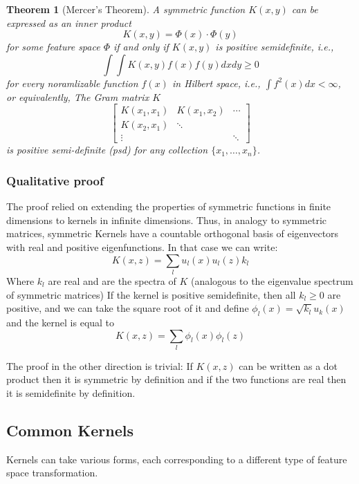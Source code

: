 \documentclass[11pt]{book} %
\newtheorem{theorem}{Theorem}[section]
\begin{document}
\begin{theorem}[Mercer's Theorem]
    A symmetric function \( K(x, y) \) can be expressed as an inner product 
    \[
        K(x, y) = \Phi(x) \cdot \Phi(y)  
    \]
    for some feature space \( \Phi \) if and only if \( K(x, y) \) is positive semidefinite, i.e.,
    \[
        \int \int K(x, y) f(x) f(y) dx dy \geq 0 
    \]
    for every noramlizable function $f(x)$ in Hilbert space, i.e., $\int f^2(x) dx < \infty$, \\
    or equivalently, The Gram matrix $K$ 
    \[
    \begin{bmatrix}
        K(x_1, x_1) & K(x_1, x_2) & \cdots \\
        K(x_2, x_1) & \ddots & \\
        \vdots & & \ddots
    \end{bmatrix}
    \]
    is positive semi-definite (psd) for any collection \( \{x_1, \dots, x_n\} \).
\end{theorem}

\subsubsection{Qualitative proof}

The proof relied on extending the properties of symmetric functions in finite dimensions to kernels in infinite dimensions. 
Thus, in analogy to symmetric matrices, symmetric Kernels have a countable orthogonal basis of eigenvectors with real and positive eigenfunctions. 
In that case we can write:
\begin{equation}
    K(x, z) = \sum_{l} u_l(x)u_l(z)k_l
\end{equation}
Where \( k_l \) are real and are the spectra of \( K \) (analogous to the eigenvalue spectrum of symmetric matrices) 
If the kernel is positive semidefinite, then all \( k_l \geq 0 \) are positive, and we can take the square root of it and define 
\( \phi_l(x) = \sqrt{k_l}u_k(x) \) and the kernel is equal to
\begin{equation}
    K(x, z) = \sum_{l} \phi_l(x) \phi_l(z)
\end{equation}

The proof in the other direction is trivial: If \( K(x, z) \) can be written as a dot product then it is symmetric 
by definition and if the two functions are real then it is semidefinite by definition.


\subsection{Common Kernels}
Kernels can take various forms, each corresponding to a different type of feature space transformation.
\end{document}
